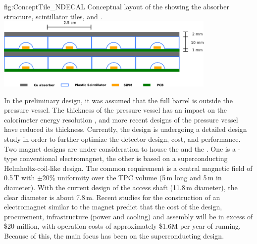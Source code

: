 \begin{dunefigure}[Conceptual layout of the \dshort{mpd} \dshort{ecal}] %
{fig:ConceptTile_NDECAL}
{Conceptual layout of the  showing the absorber structure, scintillator tiles,  and .}
\includegraphics[width=0.8\textwidth]{graphics/TileConcept.png}
\end{dunefigure}

In the preliminary design, it was assumed that the full  barrel is outside the pressure vessel.  The thickness of the pressure vessel has an impact on the calorimeter energy resolution \cite{Emberger:2018pgr}, and more recent designs of the pressure vessel have reduced its thickness.
Currently, the  design is undergoing a detailed design study in order to further optimize the detector design, cost, and performance.  
%
\label{sssec:nd:appx:mpd-magnet}
%
Two magnet designs are under consideration to house the  and the . One is a -type conventional electromagnet, the other is based on a superconducting Helmholtz-coil-like design. The common requirement is a central magnetic field of 0.5\,T with $\pm$20\% uniformity over the TPC volume (5\,m long and 5\,m in diameter). With the current design of the access shaft (11.8\,m diameter), the clear diameter is about 7.8\,m. Recent studies for the construction of an electromagnet similar to the  magnet predict that the cost of the design, procurement, infrastructure (power and cooling) and assembly will be in excess of \$20 million, with operation costs of approximately \$1.6M per year of running.  Because of this, the main focus has been on the superconducting design.
%
